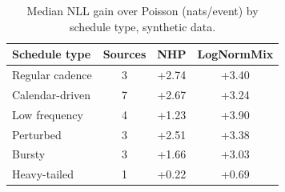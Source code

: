 \begin{table}[t]
\centering\small
\caption{Median NLL gain over Poisson (nats/event) by schedule type, synthetic data.}
\label{tab:groups}
\begin{tabular}{lccc}
\toprule
Schedule type & Sources & NHP & LogNormMix \\
\midrule
Regular cadence & 3 & +2.74 & +3.40 \\
Calendar-driven & 7 & +2.67 & +3.24 \\
Low frequency & 4 & +1.23 & +3.90 \\
Perturbed & 3 & +2.51 & +3.38 \\
Bursty & 3 & +1.66 & +3.03 \\
Heavy-tailed & 1 & +0.22 & +0.69 \\
\bottomrule
\end{tabular}
\end{table}

